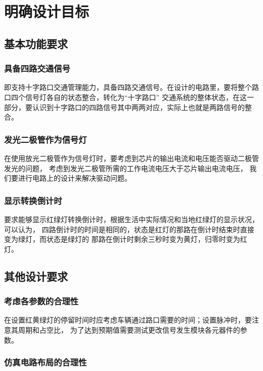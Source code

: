 \documentclass[AutoFakeBold]{LZUThesis}
\begin{document}
\mainmatter

\chapter{明确设计目标}

\section{基本功能要求}

\subsection{具备四路交通信号}

即支持十字路口交通管理能力，具备四路交通信号。在设计的电路里，要将整个路口四个信号灯各自的状态整合，转化为“十字路口”
交通系统的整体状态，在这一部分，要认识到十字路口的四路信号其中两两对应，实际上也就是两路信号的整合。


\subsection{发光二极管作为信号灯}

在使用放光二极管作为信号灯时，要考虑到芯片的输出电流和电压能否驱动二极管发光的问题，
考虑到发光二极管所需的工作电流电压大于芯片输出电流电压，
我们要进行电路上的设计来解决驱动问题。

\subsection{显示转换倒计时}

要求能够显示红绿灯转换倒计时，根据生活中实际情况和当地红绿灯的显示状况，可以认为，
四路倒计时的时间是相同的，状态是红灯的那路在倒计时结束时直接变为绿灯，而状态是绿灯的
那路在倒计时剩余三秒时变为黄灯，归零时变为红灯。

\section{其他设计要求}
\subsection{考虑各参数的合理性}

在设置红黄绿灯的停留时间时应考虑车辆通过路口需要的时间；设置脉冲时，要注意其周期和占空比，
为了达到预期值需要测试更改信号发生模块各元器件的参数。

\subsection{仿真电路布局的合理性}
\end{document}
